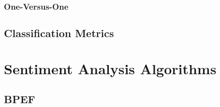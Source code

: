 \subsubsection{One-Versus-One}













\subsection{Classification Metrics}








\section{Sentiment Analysis Algorithms}



\subsection{BPEF}

